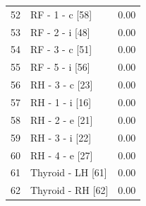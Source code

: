 \documentclass[11pt,a4paper]{article}
\begin{document}
\begin{longtable}{@{}rlr@{}}
    52 & RF - 1 - c [58] & 0.00 \\
    53 & RF - 2 - i [48] & 0.00 \\
    54 & RF - 3 - c [51] & 0.00 \\
    55 & RF - 5 - i [56] & 0.00 \\
    56 & RH - 3 - c [23] & 0.00 \\
    57 & RH - 1 - i [16] & 0.00 \\
    58 & RH - 2 - e [21] & 0.00 \\
    59 & RH - 3 - i [22] & 0.00 \\
    60 & RH - 4 - e [27] & 0.00 \\
    61 & Thyroid - LH [61] & 0.00 \\
    62 & Thyroid - RH [62] & 0.00 \\
\end{longtable}
\end{document}
